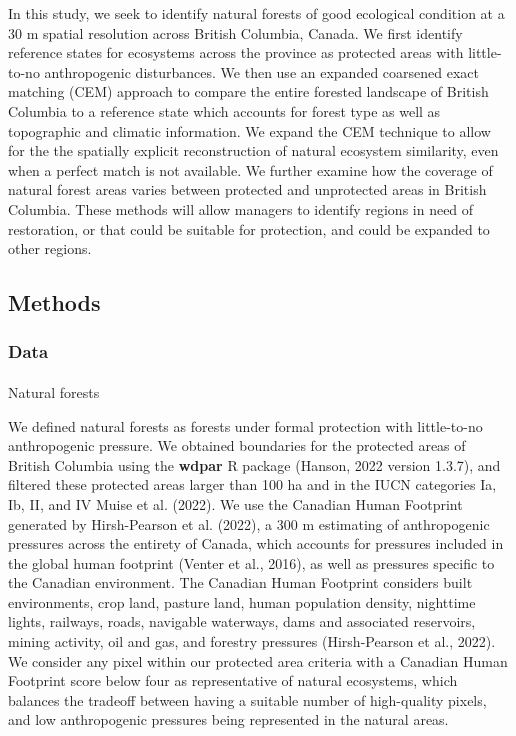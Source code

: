 \documentclass[
]{agujournal2019}
\makeatletter
\let\oldparagraph\paragraph
\renewcommand{\paragraph}{
    \@ifstar
      \xxxParagraphStar
      \xxxParagraphNoStar
  }
\newcommand{\xxxParagraphStar}[1]{\oldparagraph*{#1}\mbox{}}
\newcommand{\xxxParagraphNoStar}[1]{\oldparagraph{#1}\mbox{}}
\makeatother
\begin{document}
In this study, we seek to identify natural forests of good ecological
condition at a 30 m spatial resolution across British Columbia, Canada.
We first identify reference states for ecosystems across the province as
protected areas with little-to-no anthropogenic disturbances. We then
use an expanded coarsened exact matching (CEM) approach to compare the
entire forested landscape of British Columbia to a reference state which
accounts for forest type as well as topographic and climatic
information. We expand the CEM technique to allow for the the spatially
explicit reconstruction of natural ecosystem similarity, even when a
perfect match is not available. We further examine how the coverage of
natural forest areas varies between protected and unprotected areas in
British Columbia. These methods will allow managers to identify regions
in need of restoration, or that could be suitable for protection, and
could be expanded to other regions.

\subsection{Methods}\label{sec-data-methods}

\subsubsection{Data}\label{data}

\paragraph{Natural forests}\label{natural-forests}

We defined natural forests as forests under formal protection with
little-to-no anthropogenic pressure. We obtained boundaries for the
protected areas of British Columbia using the \textbf{wdpar} R package
(Hanson, 2022 version 1.3.7), and filtered these protected areas larger
than 100 ha and in the IUCN categories Ia, Ib, II, and IV Muise et al.
(2022). We use the Canadian Human Footprint generated by Hirsh-Pearson
et al. (2022), a 300 m estimating of anthropogenic pressures across the
entirety of Canada, which accounts for pressures included in the global
human footprint (Venter et al., 2016), as well as pressures specific to
the Canadian environment. The Canadian Human Footprint considers built
environments, crop land, pasture land, human population density,
nighttime lights, railways, roads, navigable waterways, dams and
associated reservoirs, mining activity, oil and gas, and forestry
pressures (Hirsh-Pearson et al., 2022). We consider any pixel within our
protected area criteria with a Canadian Human Footprint score below four
as representative of natural ecosystems, which balances the tradeoff
between having a suitable number of high-quality pixels, and low
anthropogenic pressures being represented in the natural areas.
\end{document}
